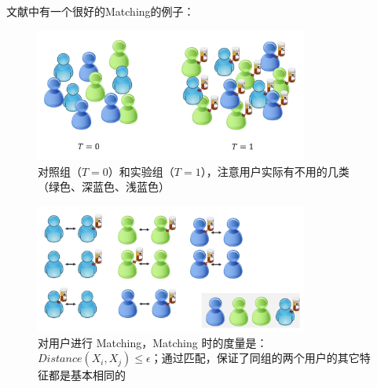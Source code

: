 \documentclass[12pt]{article}
\begin{document}
文献\cite{Causal_Inference_and_Stable_Learning}中有一个很好的Matching的例子：
\begin{figure}[H]
    \centering
    \caption*{对照组（$T=0$）和实验组（$T=1$），注意用户实际有不用的几类（绿色、深蓝色、浅蓝色）}
    \includegraphics[width=0.8\textwidth]{fig/Causal_Inference_and_Stable_Learning-Matching-1.png}
\end{figure}

\begin{figure}[H]
    \centering
    \caption*{对用户进行 Matching，Matching 时的度量是：$Distance(X_i, X_j) \le \epsilon$；通过匹配，保证了同组的两个用户的其它特征都是基本相同的}
    \includegraphics[width=0.8\textwidth]{fig/Causal_Inference_and_Stable_Learning-Matching-2.png}
\end{figure}



\end{document}
